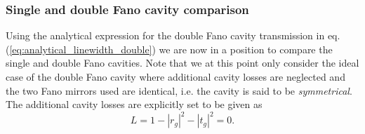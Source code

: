 \subsubsection{Single and double Fano cavity comparison}

Using the analytical expression for the double Fano cavity transmission in eq. (\ref{eq:analytical_linewidth_double}) we are now in a position to compare the single and double Fano cavities. Note that we at this point only consider the ideal case of the double Fano cavity where additional cavity losses are neglected and the two Fano mirrors used are identical, i.e. the cavity is said to be \emph{symmetrical}. The additional cavity losses are explicitly set to be given as
\begin{equation}
    L = 1-|r_g|^2-|t_g|^2 = 0.
\end{equation}

